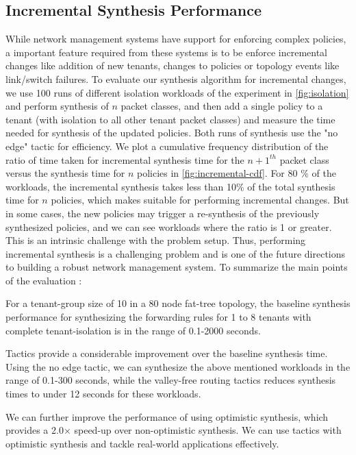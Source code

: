 \subsection{Incremental Synthesis Performance} \label{sec:incrementaleval}
While network management systems have support for enforcing complex policies, 
a important feature required from these systems is to be enforce incremental changes
like addition of new tenants, changes to policies or topology events like link/switch 
failures. To evaluate our synthesis algorithm for incremental changes, we use 100 runs of 
different isolation workloads of the experiment in  \cref{fig:isolation} and perform synthesis
of $n$ packet classes, and then
add a single policy to a tenant (with isolation to all other tenant packet classes) and
measure the time needed for synthesis of the updated policies. Both runs of synthesis use the
"no edge" tactic for efficiency. We plot a cumulative frequency 
distribution of the ratio of time taken for incremental synthesis time for the $n+1^{th}$ packet class
 versus the synthesis time for $n$ policies  in \cref{fig:incremental-cdf}. For 80 \% of the workloads, the incremental 
synthesis takes less than 10\% of the total synthesis time for $n$ policies, which makes \Name suitable for 
performing incremental changes. But in some cases, the new policies may trigger a re-synthesis 
of the previously synthesized policies, and we can see workloads where the ratio is 1 or greater. This 
is an intrinsic challenge with the problem setup. 
Thus, performing incremental synthesis is a challenging problem and is one of the future directions
to building a robust network management system. \newline
To summarize the main points of the evaluation : 
\begin{compactitemize}
	\item For a tenant-group size of 10 in a 80 node fat-tree topology, the baseline 
	synthesis performance for synthesizing the forwarding rules for 1 to 8 tenants with 
	complete tenant-isolation is in the range of 0.1-2000 seconds. 
	\item Tactics provide a considerable improvement over the baseline synthesis time.
	 Using the no edge tactic, we can synthesize the above mentioned workloads in the 
	 range of 0.1-300 seconds, while the valley-free routing tactics reduces synthesis
	 times to under 12 seconds for these workloads. 
	 \item We can further improve the performance of \Name using optimistic synthesis,
	 which provides a 2.0$\times$ speed-up over non-optimistic synthesis. We can use
	 tactics with optimistic synthesis and tackle real-world applications effectively. 
\end{compactitemize}


